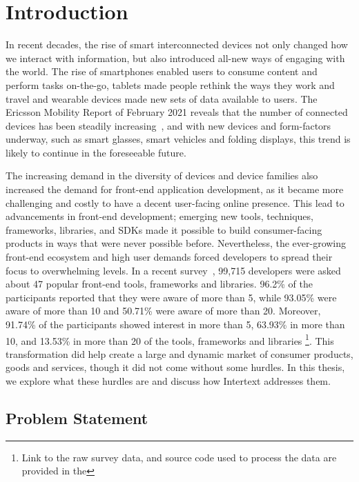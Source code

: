 
\chapter{Introduction} \label{introduction}

In recent decades, the rise of smart interconnected devices not only changed how we interact with information, but also introduced all-new ways of engaging with the world. The rise of smartphones enabled users to consume content and perform tasks on-the-go, tablets made people rethink the ways they work and travel and wearable devices made new sets of data available to users. The Ericsson Mobility Report of February 2021 reveals that the number of connected devices has been steadily increasing~\cite{EricssonMobility2020}, and with new devices and form-factors underway, such as smart glasses, smart vehicles and folding displays, this trend is likely to continue in the foreseeable future. 

The increasing demand in the diversity of devices and device families also increased the demand for front-end application development, as it became more challenging and costly to have a decent user-facing online presence. This lead to advancements in front-end development; emerging new tools, techniques, frameworks, libraries, and SDKs made it possible to build consumer-facing products in ways that were never possible before. Nevertheless, the ever-growing front-end ecosystem and high user demands forced developers to spread their focus to overwhelming levels. In a recent survey~\cite{StateOfJs2020}, 99,715 developers were asked about 47 popular front-end tools, frameworks and libraries. 96.2\% of the participants reported that they were aware of more than 5, while 93.05\% were aware of more than 10 and 50.71\% were aware of more than 20. Moreover, 91.74\% of the participants showed interest in more than 5, 63.93\% in more than 10, and 13.53\% in more than 20 of the tools, frameworks and libraries \footnote{Link to the raw survey data, and source code used to process the data are provided in the }. This transformation did help create a large and dynamic market of consumer products, goods and services, though it did not come without some hurdles. In this thesis, we explore what these hurdles are and discuss how Intertext addresses them.

\section{Problem Statement} \label{problemStatement}

